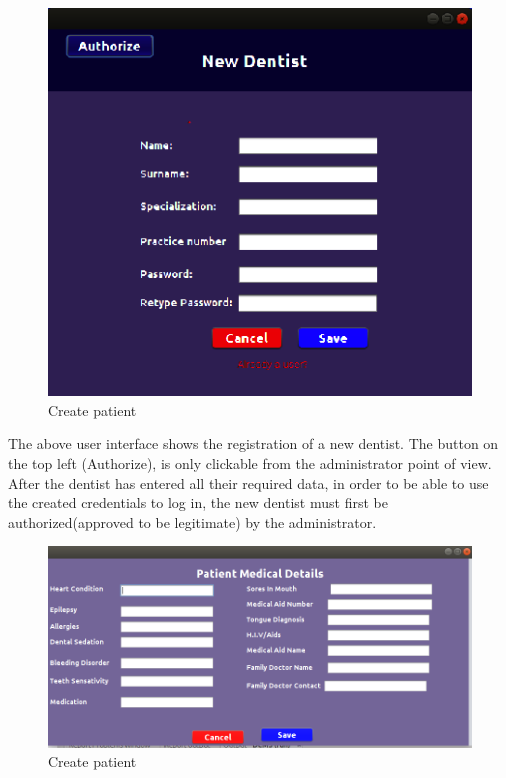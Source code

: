 \documentclass[11 pt]{article}
\begin{document}
 \begin{figure}[h]
    \centering 
    \includegraphics[width=\linewidth]{new dentist.png}
    \caption{Create patient}
    \label{fig:Create New Patient}
    \end{figure}
The above user interface shows the registration of a new dentist. The button on the top left (Authorize), is only clickable from the administrator point of view. After the dentist has entered all their required data, in order to be able to use the created credentials to log in, the new dentist must first be authorized(approved to be legitimate) by the administrator. 
\begin{figure}[h]
    \centering 
    \includegraphics[width=\linewidth]{patientmedicalcond.png}
    \caption{Create patient}
    \label{fig:Appointment}
    \end{figure}
\end{document}
